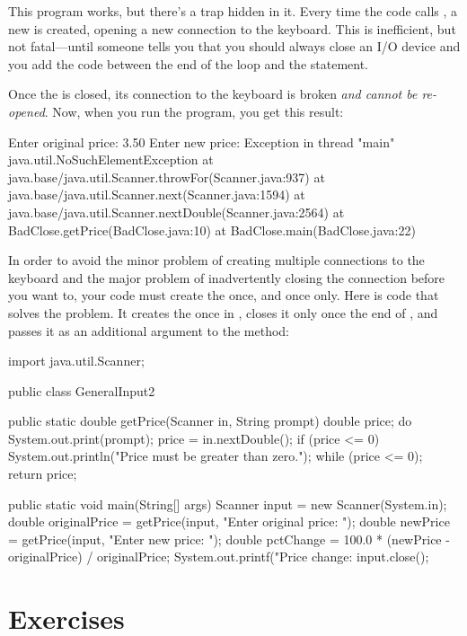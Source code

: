 This program works, but there's a trap hidden in it. Every time the code calls , a new  is created, opening a new connection to the keyboard. This is inefficient, but not fatal---until someone tells you that you should always close an I/O device and you add the code  between the end of the loop and the  statement.

Once the  is closed, its connection to the keyboard is broken {\em and cannot be re-opened}. Now, when you run the program, you get this result:

\begin{stdout}
Enter original price: 3.50
Enter new price: Exception in thread "main"
  java.util.NoSuchElementException
        at java.base/java.util.Scanner.throwFor(Scanner.java:937)
        at java.base/java.util.Scanner.next(Scanner.java:1594)
        at java.base/java.util.Scanner.nextDouble(Scanner.java:2564)
        at BadClose.getPrice(BadClose.java:10)
        at BadClose.main(BadClose.java:22)
\end{stdout}

In order to avoid the minor problem of creating multiple connections to the keyboard and the major problem of inadvertently closing the connection before you want to, your code must create the  once, and once only. Here is code that solves the problem. It creates the  once in , closes it only once the end of , and passes it as an additional argument to the  method:

\begin{code}
import java.util.Scanner;

public class GeneralInput2 {
  
  public static double getPrice(Scanner in, String prompt) {
    double price;
    do {
      System.out.print(prompt);
      price = in.nextDouble();
      if (price <= 0) {
        System.out.println("Price must be greater than zero.");
      }
    } while (price <= 0);
    return price;
  }

    
  public static void main(String[] args) {
    Scanner input = new Scanner(System.in);
    double originalPrice = getPrice(input, "Enter original price: ");
    double newPrice = getPrice(input, "Enter new price: ");
    double pctChange = 100.0 *
      (newPrice - originalPrice) / originalPrice;
    System.out.printf("Price change: %
    input.close();
  }
}
\end{code}

\section{Exercises}

\begin{exercise}

\end{exercise}

